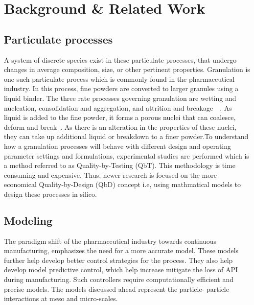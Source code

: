 \documentclass[preprint,11pt,authoryear]{elsarticle}
\begin{document}
\section{Background \& Related Work}

\subsection{Particulate processes}
A system of discrete species exist in these particulate processes, 
that undergo changes in average
composition, size, or other pertinent properties. Granulation is one such
particulate process which is commonly found in the pharmaceutical industry. In
this process, fine powders are converted to larger granules using a liquid
binder. The three rate processes governing granulation are wetting and
nucleation, consolidation and aggregation, and attrition and
breakage~\citep{Iveson2001}~\citep{Cameron2005}. As liquid is added to the
fine powder, it forms a porous nuclei that can coalesce, deform and
break~\citep{Barrasso2015ces}. As there is an alteration in the properties of
these nuclei, they can take up additional liquid or breakdown to a finer
powder.To understand how a granulation processes will behave with different
design and operating parameter settings and formulations, experimental studies
are performed which is a method referred to as Quality-by-Testing (QbT). This
methodology is time consuming and expensive. Thus, newer research is focused
on the more economical Quality-by-Design (QbD) concept i.e, using mathmatical 
models to design these processes in silico.

\subsection{Modeling}
The paradigm shift of the pharmaceutical industry towards continuous 
manufacturing, emphasizes the need for a more accurate model. These models
further help develop better control strategies for the process. 
They also help develop model predictive control, which help increase mitigate the 
loss of API during manufacturing. Such controllers require computationally 
efficient and precise models. The models discussed ahead represent the particle-
particle interactions at meso and micro-scales.
\end{document}
